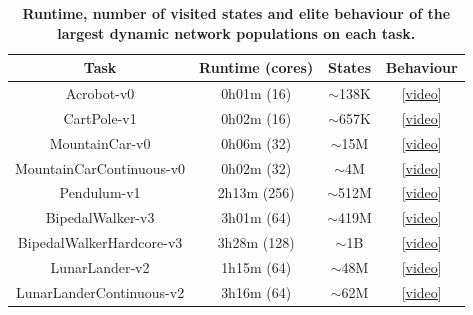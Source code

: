 \documentclass{article} %
\begin{document}
\renewcommand{\arraystretch}{.9}
\begin{table}[H]
  \centering
  \caption{\textbf{Runtime, number of visited states and elite behaviour of the largest dynamic network populations on each task.}}
  \label{tab:freq}
  \setlength\tabcolsep{2.1pt}
  \begin{tabular}{|c|ccc|}
    \hline
    Task & Runtime (cores) & States & Behaviour\\
    \hline
    Acrobot-v0 & 0h01m \hspace{0.15cm}(16) & $\sim$138K & [\textcolor{blue}{\underline{\href{https://drive.google.com/file/d/1thyWIyHvT4j_F9owgBghHrQhJPA1myJJ/view}{video}}}]\\
    CartPole-v1 & 0h02m \hspace{0.15cm}(16) & $\sim$657K & [\textcolor{blue}{\underline{\href{https://drive.google.com/file/d/1F-pJFmrcKw96c-uDSIXkX4oXrUOc1S3y/view}{video}}}]\\
    MountainCar-v0  & 0h06m \hspace{0.15cm}(32) & $\sim$15M & [\textcolor{blue}{\underline{\href{https://drive.google.com/file/d/1vmOv5tIlezcDJca5Zh7rNbdxpRShgvj0/view}{video}}}]\\
    MountainCarContinuous-v0 &  0h02m \hspace{0.15cm}(32) & $\sim$4M & [\textcolor{blue}{\underline{\href{https://drive.google.com/file/d/1JURqnZ8I2iwCFnd6Nc5XJS7o4-1ucalp/view}{video}}}]\\
    Pendulum-v1 & 2h13m (256) & $\sim$512M & [\textcolor{blue}{\underline{\href{https://drive.google.com/file/d/1e_34-BfUhQgm0FHRMSzg66Gjx1koL4tr/view}{video}}}]\\
    BipedalWalker-v3 & 3h01m \hspace{0.15cm}(64) & $\sim$419M & [\textcolor{blue}{\underline{\href{https://drive.google.com/file/d/1LW6MEzKzoSu3z1pZR0QtD-QalRWoIoyV/view}{video}}}]\\
    BipedalWalkerHardcore-v3 & 3h28m (128) & $\sim$1B & [\textcolor{blue}{\underline{\href{https://drive.google.com/file/d/1th6M8PEjXgaIC1Lq_eR8symzcRe2wL9v/view}{video}}}]\\
    LunarLander-v2 & 1h15m \hspace{0.15cm}(64) & $\sim$48M & [\textcolor{blue}{\underline{\href{https://drive.google.com/file/d/14keCx-ZZ1vJ3J_oQ3JfK0sMWtZClfFuh/view}{video}}}]\\
    LunarLanderContinuous-v2 & 3h16m \hspace{0.15cm}(64) & $\sim$62M & [\textcolor{blue}{\underline{\href{https://drive.google.com/file/d/1xT58dhP8n_gr0kemk2f6gY4BVspClEx6/view}{video}}}]\\

\end{tabular}
\end{table}
\end{document}

